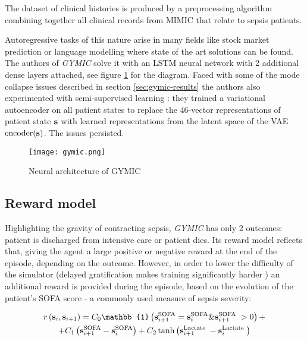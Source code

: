The dataset of clinical histories is produced by a preprocessing algorithm combining together all clinical records from MIMIC that relate to sepsis patients.

Autoregressive tasks of this nature arise in many fields like stock market prediction \cite{stonks1,stonks2} or language modelling \cite{langmodels} where state of the art solutions can be found.
The authors of \emph{GYMIC} solve it with an LSTM \cite{hochreiterLongShorttermMemory1997} neural network with 2 additional dense layers attached, see figure \ref{fig:gymic} for the diagram.
Faced with some of the mode collapse issues described in section \ref{sec:gymic-results} the authors also experimented with semi-supervised learning \cite{learningSemisupervisedLearning2006}: they trained a variational autoencoder \cite{kingma2019introduction} on all patient states to replace the 46-vector representations of patient state $\textbf{s}$ with learned representations from the latent space of the VAE $\text{encoder}(\textbf{s})$.
The issues persisted.

\begin{figure}
    \centering
    \texttt{[image: gymic.png]}
    \caption{Neural architecture of GYMIC}
    \label{fig:gymic}
\end{figure}

\subsection{Reward model}

Highlighting the gravity of contracting sepsis, \emph{GYMIC} has only 2 outcomes: patient is discharged from intensive care or patient dies.
Its reward model reflects that, giving the agent a large positive or negative reward at the end of the episode, depending on the outcome.
However, in order to lower the difficulty of the simulator (delayed gratification makes training significantly harder \cite{delayedgrat-humans,gulwaniProgramSynthesis2017}) an additional reward is provided during the episode, based on the evolution of the patient's SOFA score \cite{sofa} - a commonly used measure of sepsis severity:

\begin{multline}
\reward\left(\state_{\step}, \state_{\step+1}\right)=C_{0} \mathbb{1}\left(\state_{\step+1}^{\mathrm{SOFA}}=\state_{\step}^{\mathrm{SOFA}} \& \state_{\step+1}^{\text{SOFA }}>0\right) + \\ +
C_{1}\left(\state_{\step+1}^{\mathrm{SOFA}}-\state_{\step}^{\mathrm{SOFA}}\right) +
C_{2} \tanh \left(\state_{\step+1}^{\text{Lactate }}-\state_{\step}^{\text{Lactate }}\right)
\end{multline}

